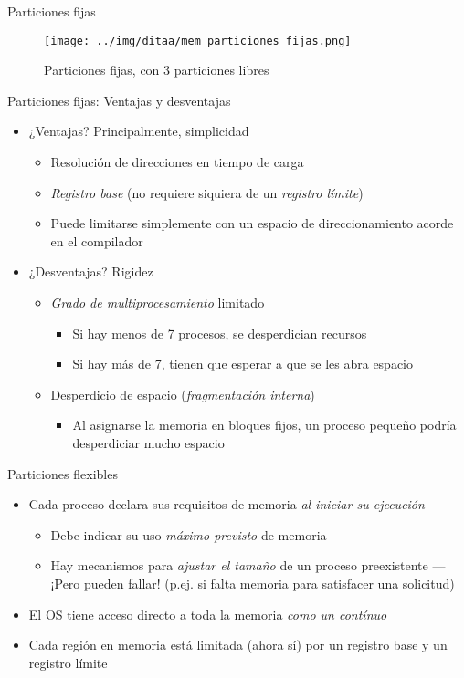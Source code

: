 \documentclass[presentation]{beamer}
\begin{document}
\begin{frame}[label={sec:orgfe6701a}]{Particiones fijas}
\begin{figure}[htbp]
\centering
\texttt{[image: ../img/ditaa/mem\_particiones\_fijas.png]}
\caption{Particiones fijas, con 3 particiones libres}
\end{figure}
\end{frame}

\begin{frame}[label={sec:orga738979}]{Particiones fijas: Ventajas y desventajas}
\begin{itemize}
\item ¿Ventajas? Principalmente, simplicidad
\begin{itemize}
\item Resolución de direcciones en tiempo de carga
\item \emph{Registro base} (no requiere siquiera de un \emph{registro límite})
\item Puede limitarse simplemente con un espacio de direccionamiento
acorde en el compilador
\end{itemize}
\item ¿Desventajas? Rigidez
\begin{itemize}
\item \emph{Grado de multiprocesamiento} limitado
\begin{itemize}
\item Si hay menos de 7 procesos, se desperdician recursos
\item Si hay más de 7, tienen que esperar a que se les abra espacio
\end{itemize}
\item Desperdicio de espacio (\emph{fragmentación interna})
\begin{itemize}
\item Al asignarse la memoria en bloques fijos, un proceso pequeño
podría desperdiciar mucho espacio
\end{itemize}
\end{itemize}
\end{itemize}
\end{frame}

\begin{frame}[label={sec:org91d03c3}]{Particiones flexibles}
\begin{itemize}
\item Cada proceso declara sus requisitos de memoria \emph{al iniciar su
ejecución}
\begin{itemize}
\item Debe indicar su uso \emph{máximo previsto} de memoria
\item Hay mecanismos para \emph{ajustar el tamaño} de un proceso
preexistente — ¡Pero pueden fallar! (p.ej. si falta memoria para
satisfacer una solicitud)
\end{itemize}
\item El OS tiene acceso directo a toda la memoria \emph{como un contínuo}
\item Cada región en memoria está limitada (ahora sí) por un registro base
y un registro límite
\end{itemize}
\end{frame}
\end{document}
